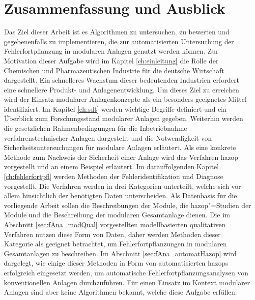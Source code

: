 \chapter{Zusammenfassung und Ausblick}\label{ch:zf}
Das Ziel dieser Arbeit ist es Algorithmen zu untersuchen, zu bewerten und gegebenenfalls zu implementieren, die zur automatisierten Untersuchung der Fehlerfortpflanzung in modularen Anlagen genutzt werden k\"onnen. \newline
Zur Motivation dieser Aufgabe wird im Kapitel \ref{ch:einleitung} die Rolle der Chemischen und Pharmazeutischen Industrie f\"ur die deutsche Wirtschaft dargestellt. Ein schnelleres Wachstum dieser bedeutenden Industrien erfordert eine schnellere Produkt- und Anlagenentwicklung. Um dieses Ziel zu erreichen wird der Einsatz modularer Anlagenkonzepte als ein besonders geeignetes Mittel identifiziert. \newline
Im Kapitel \ref{ch:sdt} werden wichtige Begriffe definiert und ein \"Uberblick zum Forschungsstand modularer Anlagen gegeben. Weiterhin werden die gesetzlichen Rahmenbedingungen f\"ur die Inbetriebnahme verfahrenstechnischer Anlagen dargestellt und die Notwendigkeit von Sicherheitsuntersuchungen f\"ur modulare Anlagen erl\"autert. Als eine konkrete Methode zum Nachweis der Sicherheit einer Anlage wird das Verfahren \ac{hazop} vorgestellt und an einem Beispiel erl\"autert. \newline
Im darauffolgenden Kapitel \ref{ch:fehlerfortpfl} werden Methoden der Fehleridentifikation und Diagnose vorgestellt. Die Verfahren werden in drei Kategorien unterteilt, welche sich vor allem hinsichtlich der ben\"otigten Daten unterscheiden. \newline
Als Datenbasis f\"ur die vorliegende Arbeit sollen die Beschreibungen der Module, die \ac{hazop}"=Studien der Module und die Beschreibung der modularen Gesamtanlage dienen. Die im Abschnitt \ref{sec:fAna_modQual} vorgestellten modellbasierten qualitativen Verfahren nutzen diese Form von Daten, daher werden Methoden dieser Kategorie als geeignet betrachtet, um Fehlerfortpflanzungen in modularen Gesamtanlagen zu beschreiben. Im Abschnitt \ref{sec:fAna_automatHazop} wird dargelegt, wie einige dieser Methoden in Form von automatisierten \acp{hazop} erfolgreich eingesetzt werden, um automatische Fehlerfortpflanzungsanalysen von konventionellen Anlagen durchzuf\"uhren. F\"ur einen Einsatz im Kontext modularer Anlagen sind aber keine Algorithmen bekannt, welche diese Aufgabe erf\"ullen. \newline
